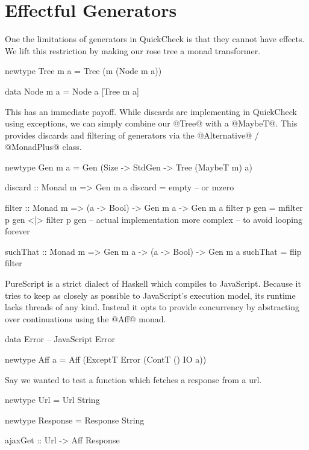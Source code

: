 \section{Effectful Generators}

One the limitations of generators in QuickCheck is that they cannot have effects. We lift this restriction by making our rose tree a monad transformer.

\begin{code}
  newtype Tree m a =
    Tree (m (Node m a))

  data Node m a =
    Node a [Tree m a]
\end{code}

This has an immediate payoff. While discards are implementing in QuickCheck using exceptions, we can simply combine our @Tree@ with a @MaybeT@. This provides discards and filtering of generators via the @Alternative@ / @MonadPlus@ class. 

\begin{code}
  newtype Gen m a =
    Gen (Size -> StdGen -> Tree (MaybeT m) a)

  discard :: Monad m => Gen m a
  discard =
    empty -- or mzero

  filter :: Monad m => (a -> Bool) -> Gen m a -> Gen m a
  filter p gen =
    mfilter p gen <|> filter p gen
    -- actual implementation more complex
    -- to avoid looping forever

  suchThat :: Monad m => Gen m a -> (a -> Bool) -> Gen m a
  suchThat =
    flip filter
\end{code}




PureScript is a strict dialect of Haskell which compiles to JavaScript. Because it tries to keep as closely as possible to JavaScript's execution model, its runtime lacks threads of any kind. Instead it opts to provide concurrency by abstracting over continuations using the @Aff@ monad.

\begin{code}
  data Error -- JavaScript Error

  newtype Aff a =
    Aff (ExceptT Error (ContT () IO a))
\end{code}

Say we wanted to test a function which fetches a response from a url.

\begin{code}
  newtype Url =
    Url String

  newtype Response =
    Response String

  ajaxGet :: Url -> Aff Response
\end{code}

